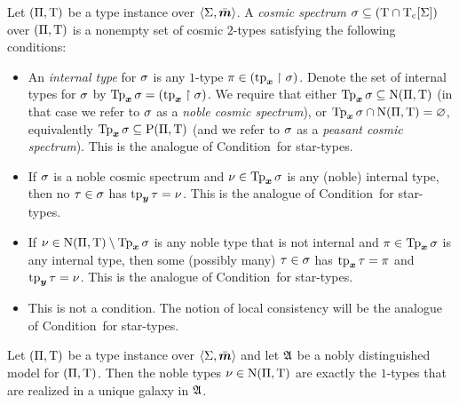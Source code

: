 \begin{definition}
Let $(\Pi,\mathrm{T})$ be a type instance over $\left\langle \mathrm{\Sigma},\bar{\bm{m}} \right\rangle$.
A \emph{cosmic spectrum} $\sigma \subseteq (\mathrm{T} \cap \mathrm{T}_{\mathrm{c}}[\mathrm{\Sigma}])$ over
$(\Pi,\mathrm{T})$ is a nonempty set of cosmic $2$-types satisfying the following
conditions:
\begin{itemize}
  \item[\condcspx]\label{cond:cspx}
  An \emph{internal type} for $\sigma$ is any $1$-type
  $\pi \in (\operatorname{tp}_{\bm{x}}\restriction\sigma)$. Denote the set of internal types for
  $\sigma$ by $\operatorname{Tp}_{\bm{x}}\sigma = (\operatorname{tp}_{\bm{x}}\restriction\sigma)$.
  We require that either $\operatorname{Tp}_{\bm{x}}\sigma \subseteq \mathrm{\mathrm{N}}(\Pi,\mathrm{T})$ (in that case we
  refer to $\sigma$ as a \emph{noble cosmic spectrum}), 
  or $\operatorname{Tp}_{\bm{x}}\sigma \cap \mathrm{\mathrm{N}}(\Pi,\mathrm{T}) = \varnothing$, equivalently $\operatorname{Tp}_{\bm{x}}\sigma
  \subseteq \mathrm{P}(\Pi,\mathrm{T})$ (and we refer to $\sigma$ as a \emph{peasant cosmic
  spectrum}).
  This is the analogue of Condition~ for star-types.
  \item[\condcspnx]\label{cond:cspnx}
  If $\sigma$ is a noble cosmic spectrum and $\nu \in \operatorname{Tp}_{\bm{x}}\sigma$ 
  is any (noble) internal type, then no $\tau \in \sigma$ has $\operatorname{tp}_{\bm{y}}\tau =
  \nu$.
  This is the analogue of Condition~ for star-types.
  \item[\condcspny]\label{cond:cspny}
  If $\nu \in \mathrm{\mathrm{N}}(\Pi,\mathrm{T}) \setminus \operatorname{Tp}_{\bm{x}}\sigma$ is any noble type
  that is not internal and $\pi \in \operatorname{Tp}_{\bm{x}}\sigma$ is any internal type, then
  some (possibly many) $\tau \in \sigma$ has $\operatorname{tp}_{\bm{x}}\tau = \pi$ and $\operatorname{tp}_{\bm{y}}\tau
  = \nu$.
  This is the analogue of Condition~ for star-types.
  \item[\condcspm]\label{cond:cspm}
  This is not a condition. The notion of local consistency
  will be the analogue of Condition~ for star-types.
\end{itemize}
\end{definition}

\begin{remark}\label{rem:str-noble-exact}
Let $(\Pi,\mathrm{T})$ be a type instance over $\left\langle \mathrm{\Sigma},\bar{\bm{m}} \right\rangle$ and let $\mathfrak{A}$
be a nobly distinguished model for $(\Pi,\mathrm{T})$. Then the noble types
$\nu \in \mathrm{\mathrm{N}}(\Pi,\mathrm{T})$ are exactly the $1$-types that are realized in a
unique galaxy in $\mathfrak{A}$.
\end{remark}


